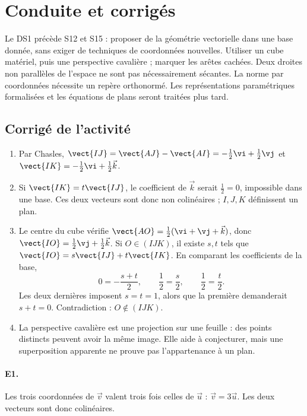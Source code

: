 \ifmxteacher\mxnewpage\section{Conduite et corrigés}\begin{teachernote}Le DS1 précède S12 et S15 : proposer de la géométrie vectorielle dans une base donnée, sans exiger de techniques de coordonnées nouvelles. Utiliser un cube matériel, puis une perspective cavalière ; marquer les arêtes cachées. Deux droites non parallèles de l'espace ne sont pas nécessairement sécantes. La norme par coordonnées nécessite un repère orthonormé. Les représentations paramétriques formalisées et les équations de plans seront traitées plus tard.\end{teachernote}

\subsection{Corrigé de l'activité}\begin{enumerate}
\item Par Chasles, $\vect{IJ}=\vect{AJ}-\vect{AI}=-\frac12\vi +\frac12\vj $ et $\vect{IK}=-\frac12\vi +\frac12\vec k$.
\item Si $\vect{IK}=t\vect{IJ}$, le coefficient de $\vec k$ serait $\frac{1}{2}=0$, impossible dans une base. Ces deux vecteurs sont donc non colinéaires ; $I,J,K$ définissent un plan.
\item Le centre du cube vérifie $\vect{AO}=\frac12(\vi +\vj +\vec k)$, donc $\vect{IO}=\frac12\vj +\frac12\vec k$. Si $O\in(IJK)$, il existe $s,t$ tels que $\vect{IO}=s\vect{IJ}+t\vect{IK}$. En comparant les coefficients de la base,
\[0=-\frac{s+t}2,\qquad \frac12=\frac s2,\qquad \frac12=\frac t2.\]
Les deux dernières imposent $s=t=1$, alors que la première demanderait $s+t=0$. Contradiction : $O\notin(IJK)$.
\item La perspective cavalière est une projection sur une feuille : des points distincts peuvent avoir la même image. Elle aide à conjecturer, mais une superposition apparente ne prouve pas l'appartenance à un plan.
\end{enumerate}

\paragraph{E1.}Les trois coordonnées de $\vec v$ valent trois fois celles de $\vec u$ : $\vec v=3\vec u$. Les deux vecteurs sont donc colinéaires.

